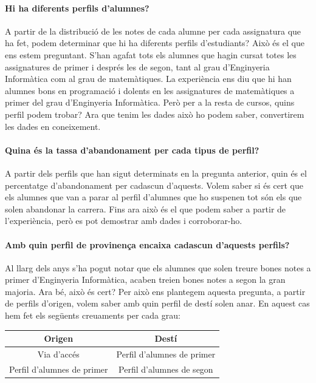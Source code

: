 \documentclass[12pt,a4paper,catalan]{article}
\begin{document}
\paragraph{Hi ha diferents perfils d'alumnes?}
A partir de la distribució de les notes de cada alumne per cada assignatura que ha fet, podem determinar que hi ha diferents perfils d'estudiants? Això és el que ens estem preguntant. S'han agafat tots els alumnes que hagin cursat totes les assignatures de primer i després les de segon, tant al grau d'Enginyeria Informàtica com al grau de matemàtiques. La experiència ens diu que hi han alumnes bons en programació i dolents en les assignatures de matemàtiques a primer del grau d'Enginyeria Informàtica. Però per a la resta de cursos, quins perfil podem trobar? Ara que tenim les dades això ho podem saber, convertirem les dades en coneixement.

\paragraph{Quina és la tassa d'abandonament per cada tipus de perfil?}
A partir dels perfils que han sigut determinats en la pregunta anterior, quin és el percentatge d'abandonament per cadascun d'aquests. Volem saber si és cert que els alumnes que van a parar al perfil d'alumnes que ho suspenen tot són els que solen abandonar la carrera. Fins ara això és el que podem saber a partir de l'experiència, però es pot demostrar amb dades i corroborar-ho.

\paragraph{Amb quin perfil de provinença encaixa cadascun d'aquests perfils?}
Al llarg dels anys s'ha pogut notar que els alumnes que solen treure bones notes a primer d'Enginyeria Informàtica, acaben treien bones notes a segon la gran majoria. Ara bé, això és cert? Per això ens plantegem aquesta pregunta, a partir de perfils d'origen, volem saber amb quin perfil de destí solen anar. En aquest cas hem fet els següents creuaments per cada grau:

\begin{table}[h]
\centering
\begin{tabular}{@{}cc@{}}
\toprule
{\bf Origen}               & {\bf Destí}                \\ \midrule
Via d'accés                & Perfil d'alumnes de primer \\
Perfil d'alumnes de primer & Perfil d'alumnes de segon  \\ \bottomrule
\end{tabular}
\end{table}
\end{document}
